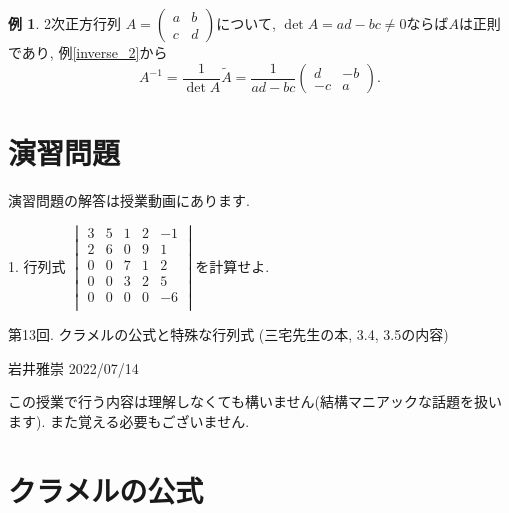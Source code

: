 \documentclass[dvipdfmx,a4paper,11pt]{article}
\theoremstyle{definition}
\newtheorem{exa}[thm]{例}
\begin{document}
\begin{exa}
2次正方行列
$
A = 
\begin{pmatrix}
a & b \\
c & d
\end{pmatrix}
$について, $\det A =ad-bc \neq0$ならば$A$は正則であり, 
例\ref{inverse_2}から
$$
A^{-1} = \frac{1}{\det A} \tilde{A}
=\frac{1}{ad-bc}
\begin{pmatrix}
d & -b \\
-c & a
\end{pmatrix}.
$$
\end{exa}

\section{演習問題}
演習問題の解答は授業動画にあります.

1. 行列式
$
\begin{vmatrix}
3 & 5&1 & 2&-1\\
2 & 6&0 & 9&1\\
0 & 0& 7& 1&2\\
0 & 0& 3& 2&5\\
0 & 0& 0& 0&-6\\
\end{vmatrix}
$を計算せよ.


\newpage

\begin{center}
{\Large 第13回. クラメルの公式と特殊な行列式 (三宅先生の本, 3.4, 3.5の内容)} 
\end{center}

\begin{flushright}
 岩井雅崇 2022/07/14
\end{flushright}

この授業で行う内容は理解しなくても構いません(結構マニアックな話題を扱います). 
また覚える必要もございません. 
\section{クラメルの公式}
\end{document}
